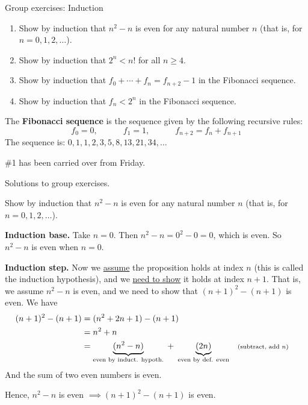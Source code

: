 \documentclass[10pt]{beamer}
\begin{document}
\begin{frame}{Group exercises: Induction}
\footnotesize 

\begin{enumerate}
\item Show by induction that $n^2-n$ is even for any natural number $n$ (that is, for $n=0,1,2,\hdots$).
\item  Show by induction that $2^n < n!$ for all $n \geq 4$.	
\item Show by induction that $f_0 + \cdots + f_n = f_{n+2} -1$ in the Fibonacci sequence.
\item Show by induction that $f_n < 2^n$ in the Fibonacci sequence. 
\end{enumerate}
\vfill 
\begin{mygreenbox}[title=Definition]
The \textbf{Fibonacci sequence} is the sequence given by the following recursive rules:
\[f_0 =0, \qquad \quad f_1 =1, \qquad \quad f_{n+2} = f_n + f_{n+1} \]
The sequence is: $0,1,1,2,3,5,8,13,21,34, \hdots$
\end{mygreenbox}
\vfill 
\begin{myyellowbox}[title=Logistics Alert]
 \#1 has been carried over from Friday.	
\end{myyellowbox}

\end{frame}

\begin{frame}[standout]
Solutions to group exercises.	
\end{frame}


\begin{frame}
\small 
\begin{mygreenbox}[title=Exercise 1]
Show by induction that $n^2-n$ is even for any natural number $n$ (that is, for $n=0,1,2,\hdots$).
\end{mygreenbox}

\vfill \vfill 
\begin{myyellowbox}[title=Solution]
\textbf{Induction base.} Take $n=0$.  Then $n^2-n = 0^2-0 = 0$, which is even. So $n^2-n$ is even when $n=0$.

\vspace{0.5cm}

\textbf{Induction step.} Now we \underline{assume} the proposition holds at index $n$ (this is called the \alert{induction hypothesis}), and we \underline{need to show} it holds at index $n+1$.  That is, we assume $n^2-n$ is even, and we need to show that $(n+1)^2-(n+1)$ is even.  We have
%
\begin{align*}
(n+1)^2-(n+1) &= (n^2+2n+1) - (n+1) \\
&= n^2+n  \\
&= \explaintermbrace{even by induct. hypoth.}{(n^2 -n)} \; + \; \explaintermbrace{even by def. even}{(2n)}  && \scripttext{(subtract, add $n$)}	
\end{align*}
And the sum of two even numbers is even.

Hence, $n^2-n$ is even $\implies (n+1)^2-(n+1)$ is even.
\end{myyellowbox}

\end{frame}
\end{document}
